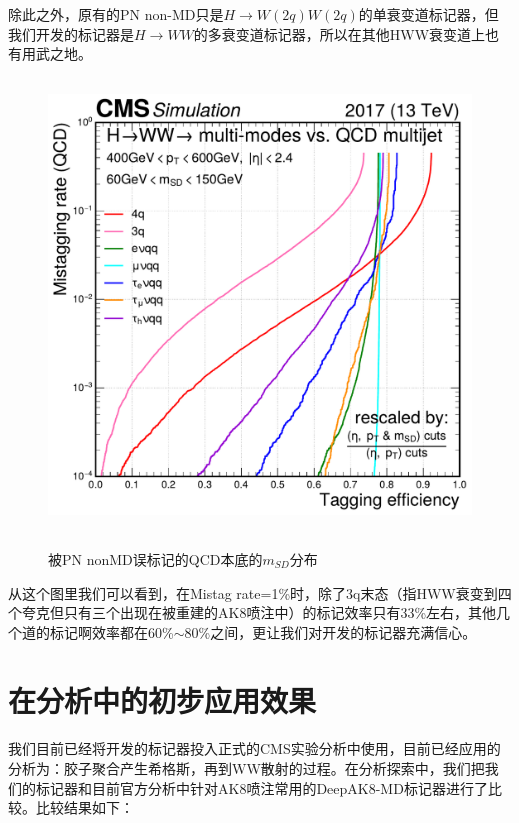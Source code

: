 除此之外，原有的PN non-MD只是$H\to W(2q)W(2q)$的单衰变道标记器，但我们开发的标记器是$H\to WW$的多衰变道标记器，所以在其他HWW衰变道上也有用武之地。
\begin{figure}[H]
 \centering
 \caption{被PN nonMD误标记的QCD本底的$m_{SD}$分布}
 \includegraphics[height=12cm, width=12cm]{pictures/ROC_multi-modes_PKU_std.pdf}
 \label{fig:5.5}
\end{figure}
从这个图里我们可以看到，在Mistag rate=1\%时，除了3q末态（指HWW衰变到四个夸克但只有三个出现在被重建的AK8喷注中）的标记效率只有33\%左右，其他几个道的标记啊效率都在60\%$\sim$80\%之间，更让我们对开发的标记器充满信心。
\section{在分析中的初步应用效果}
我们目前已经将开发的标记器投入正式的CMS实验分析中使用，目前已经应用的分析为：胶子聚合产生希格斯，再到WW散射的过程。在分析探索中，我们把我们的标记器和目前官方分析中针对AK8喷注常用的DeepAK8-MD标记器进行了比较。比较结果如下：


